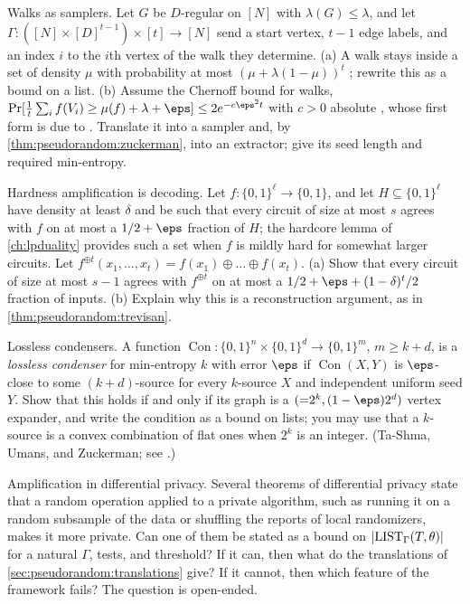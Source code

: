 \begin{refsection}
\begin{exercises}
\item \transfer\label{ex:pseudorandom:walks} Walks as samplers. Let $G$ be $D$-regular on $[N]$ with $\lambda(G)\le\lambda$, and let $\Gamma\colon([N]\times[D]^{t-1})\times[t]\to[N]$ send a start vertex, $t-1$ edge labels, and an index $i$ to the $i$th vertex of the walk they determine. (a) A walk stays inside a set of density $\mu$ with probability at most $(\mu+\lambda(1-\mu))^t$ \parencite[Theorem~4.17]{Vadhan2012}; rewrite this as a bound on a list. (b) Assume the Chernoff bound for walks, $\Pr[\frac1t\sum_if(V_i)\ge\mu(f)+\lambda+\eps]\le2e^{-c\eps^2t}$ with $c>0$ absolute \parencite[Theorem~4.22]{Vadhan2012}, whose first form is due to \textcite{Gillman1998}. Translate it into a sampler and, by \cref{thm:pseudorandom:zuckerman}, into an extractor; give its seed length and required min-entropy.

\item \transfer\hard\label{ex:pseudorandom:xor} Hardness amplification is decoding. Let $f\colon\{0,1\}^\ell\to\{0,1\}$, and let $H\subseteq\{0,1\}^\ell$ have density at least $\delta$ and be such that every circuit of size at most $s$ agrees with $f$ on at most a $1/2+\eps$ fraction of $H$; the hardcore lemma of \cref{ch:lpduality} provides such a set when $f$ is mildly hard for somewhat larger circuits. Let $f^{\oplus t}(x_1,\dots,x_t)=f(x_1)\oplus\dots\oplus f(x_t)$. (a) Show that every circuit of size at most $s-1$ agrees with $f^{\oplus t}$ on at most a $1/2+\eps+(1-\delta)^t/2$ fraction of inputs. (b) Explain why this is a reconstruction argument, as in \cref{thm:pseudorandom:trevisan}. 

\item \transfer\label{ex:pseudorandom:condenser} Lossless condensers. A function $\operatorname{Con}\colon\{0,1\}^n\times\{0,1\}^d\to\{0,1\}^m$, $m\ge k+d$, is a \emph{lossless condenser} for min-entropy $k$ with error $\eps$ if $\operatorname{Con}(X,Y)$ is $\eps$-close to some $(k+d)$-source for every $k$-source $X$ and independent uniform seed $Y$. Show that this holds if and only if its graph is a $({=}2^k,(1-\eps)2^d)$ vertex expander, and write the condition as a bound on lists; you may use that a $k$-source is a convex combination of flat ones when $2^k$ is an integer. (Ta-Shma, Umans, and Zuckerman; see \textcite[Proposition~6.33]{Vadhan2012}.)

\item \research\label{ex:pseudorandom:dp} Amplification in differential privacy. Several theorems of differential privacy state that a random operation applied to a private algorithm, such as running it on a random subsample of the data or shuffling the reports of local randomizers, makes it more private. Can one of them be stated as a bound on $|\mathrm{LIST}_\Gamma(T,\theta)|$ for a natural $\Gamma$, tests, and threshold? If it can, then what do the translations of \cref{sec:pseudorandom:translations} give? If it cannot, then which feature of the framework fails? The question is open-ended.


\end{exercises}
\end{refsection}
